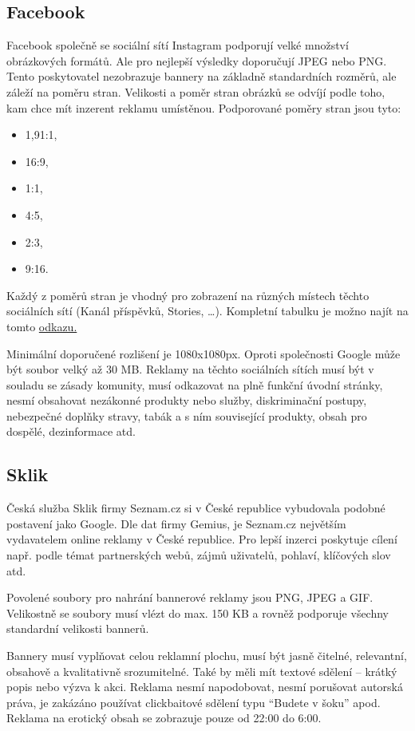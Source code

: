     \subsection{Facebook}
    Facebook společně se sociální sítí Instagram podporují velké množství obrázkových formátů. Ale pro nejlepší výsledky doporučují JPEG nebo PNG.
    Tento poskytovatel nezobrazuje bannery na základně standardních rozměrů, ale záleží na poměru stran.
    Velikosti a poměr stran obrázků se odvíjí podle toho, kam chce mít inzerent reklamu umístěnou. Podporované poměry stran jsou tyto:
    \begin{itemize}
        \item 1,91:1,
        \item 16:9,
        \item 1:1,
        \item 4:5,
        \item 2:3,
        \item 9:16.
    \end{itemize}

    Každý z poměrů stran je vhodný pro zobrazení na různých místech těchto sociálních sítí (Kanál příspěvků, Stories, \ldots).
    Kompletní tabulku je možno najít na tomto \href{https://www.facebook.com/business/help/682655495435254?id=271710926837064}{odkazu.}\cite{facebook:table}

    Minimální doporučené rozlišení je 1080x1080px. Oproti společnosti Google může být soubor velký až 30 MB.
    Reklamy na těchto sociálních sítích musí být v souladu se zásady komunity, musí odkazovat na plně funkční úvodní stránky,
    nesmí obsahovat nezákonné produkty nebo služby, diskriminační postupy, nebezpečné doplňky stravy, tabák a s ním související produkty,
    obsah pro dospělé, dezinformace atd.

    \subsection{Sklik}
    Česká služba Sklik firmy Seznam.cz si v České republice vybudovala podobné postavení jako Google.
    Dle dat firmy Gemius, je Seznam.cz největším vydavatelem online reklamy v České republice. Pro lepší inzerci poskytuje cílení
    např. podle témat partnerských webů, zájmů uživatelů, pohlaví, klíčových slov atd.

    Povolené soubory pro nahrání bannerové reklamy jsou PNG, JPEG a GIF. Velikostně se soubory musí vlézt do max. 150 KB a
    rovněž podporuje všechny standardní velikosti bannerů.

    Bannery musí vyplňovat celou reklamní plochu, musí být jasně čitelné, relevantní, obsahově a kvalitativně srozumitelné.
    Také by měli mít textové sdělení -- krátký popis nebo výzva k akci. Reklama nesmí napodobovat, nesmí porušovat autorská práva,
    je zakázáno používat clickbaitové sdělení typu \enquote{Budete v šoku} apod. Reklama na erotický obsah se zobrazuje pouze od 22:00 do 6:00.  

\endinput